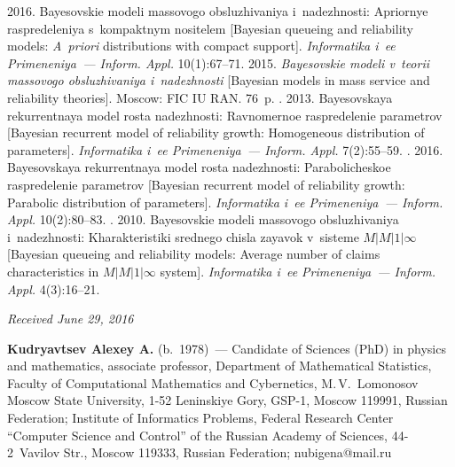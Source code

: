   \begin{multicols}{2}

\renewcommand{\bibname}{\protect\rmfamily References}

{\small\frenchspacing
 {%
 \begin{thebibliography}{9}



 2016. Bayesovskie modeli massovogo 
obsluzhivaniya i~nadezhnosti: Apriornye raspredeleniya s~kompaktnym nositelem 
[Bayesian queueing and reliability models: \textit{A~priori} distributions with compact support]. 
\textit{Informatika i~ee Primeneniya~--- Inform. Appl.} 10(1):67--71.
 2015. \textit{Bayesovskie modeli 
v~teorii massovogo obsluzhivaniya i~nadezhnosti} [Bayesian models in mass service 
and reliability theories]. Moscow: FIC IU RAN. 76~p.
. 2013. 
Bayesovskaya rekurrentnaya model rosta nadezhnosti: Ravnomernoe raspredelenie 
parametrov [Bayesian recurrent model of reliability growth: 
Homogeneous distribution of parameters]. \textit{Informatika i~ee Primeneniya~---
Inform. Appl.} 7(2):55--59.
. 2016. Bayesovskaya rekurrentnaya 
model rosta nadezhnosti: Parabolicheskoe raspredelenie parametrov 
[Bayesian recurrent model of reliability growth: Parabolic distribution of parameters].
\textit{Informatika i~ee Primeneniya~---
Inform. Appl.} 10(2):80--83.
. 2010. Bayesovskie 
modeli massovogo obsluzhivaniya i~nadezhnosti: Kharakteristiki srednego chisla zayavok 
v~sisteme  $M|M|1|\infty$ [Bayesian queueing and reliability models: 
Average number of claims characteristics in $M|M|1|\infty$ system]. 
\textit{Informatika i~ee Primeneniya~--- Inform. Appl.} 4(3):16--21.
 \end{thebibliography}

 }
 }

\end{multicols}

\vspace*{-3pt}

\hfill{\small\textit{Received June 29, 2016}}


\Contrl

\noindent
\textbf{Kudryavtsev Alexey A.} (b.\ 1978)~--- Candidate of Sciences (PhD) 
in physics and mathematics, associate professor, Department of Mathematical 
Statistics, Faculty of Computational Mathematics and Cybernetics, M.\,V.~Lomonosov 
Moscow State University, 1-52 Leninskiye Gory, GSP-1, Moscow 119991, 
Russian Federation; Institute of Informatics Problems, Federal Research Center 
``Computer Science and Control'' of the Russian Academy of Sciences, 
44-2~Vavilov Str., Moscow 119333, Russian Federation; \mbox{nubigena@mail.ru}

\label{end\stat}


\renewcommand{\bibname}{\protect\rm Литература} 



 
